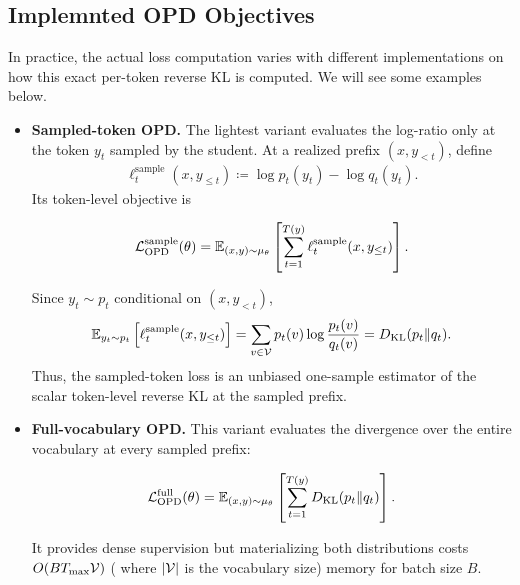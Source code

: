 \subsection{Implemnted OPD Objectives}
In practice, the actual loss computation varies with different implementations on how this exact per-token reverse KL is computed. We will see some examples below.

\begin{itemize}
    \item \textbf{Sampled-token OPD.}
    The lightest variant evaluates the log-ratio only at the token $y_t$
    sampled by the student. At a realized prefix $(x,y_{<t})$, define
    \begin{align}
        \ell_t^{\mathrm{sample}}(x,y_{\leq t})
        \coloneqq
        \log p_t(y_t)-\log q_t(y_t).
        \label{eq:opd.sampled-token-loss}
    \end{align}
    Its token-level objective is
    \begin{highlight}
        \begin{align}
            {\cal L}_{\mathrm{OPD}}^{\mathrm{sample}}(\theta)
            =
            \mathbb{E}_{(x,y)\sim\mu_\theta}
            \left[
                \sum_{t=1}^{T(y)}
                \ell_t^{\mathrm{sample}}(x,y_{\leq t})
            \right].
            \label{eq:opd.sampled-token-objective}
        \end{align}
    \end{highlight}
    Since $y_t\sim p_t$ conditional on $(x,y_{<t})$,
    \begin{align}
        \mathbb{E}_{y_t\sim p_t}
        \left[
            \ell_t^{\mathrm{sample}}(x,y_{\leq t})
        \right]
        =
        \sum_{v\in{\cal V}}p_t(v)\log\frac{p_t(v)}{q_t(v)}
        =
        D_{\mathrm{KL}}(p_t\|q_t).
        \label{eq:opd.sampled-token-unbiased}
    \end{align}
    Thus, the sampled-token loss is an unbiased one-sample estimator of the
    scalar token-level reverse KL at the sampled prefix.

    \item \textbf{Full-vocabulary OPD.}
    This variant evaluates the divergence over the entire vocabulary at every
    sampled prefix:
    \begin{highlight}
        \begin{align}
            {\cal L}_{\mathrm{OPD}}^{\mathrm{full}}(\theta)
            =
            \mathbb{E}_{(x,y)\sim\mu_\theta}
            \left[
                \sum_{t=1}^{T(y)}
                D_{\mathrm{KL}}(p_t\|q_t)
            \right].
            \label{eq:opd.full-vocabulary-objective}
        \end{align}
    \end{highlight}
    It provides dense supervision but materializing both distributions costs
    $O(BT_{\max}{\cal V})$ ( where $|{\cal V}|$ is the vocabulary size) memory for batch size $B$.


\end{itemize}
